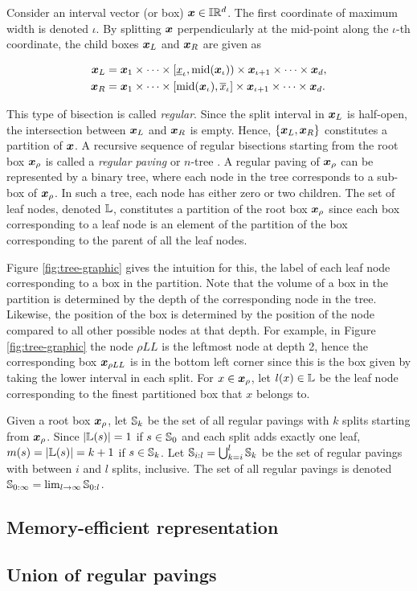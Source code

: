 \documentclass[../mapped-regular-pavings.tex]{subfiles}
\begin{document}
  
  Consider an interval vector (or box) $\x \in \Iz \Rz^d$.
  The first coordinate of maximum width is denoted $\iota$.
  By splitting $\x$ perpendicularly at the mid-point along the $\iota$-th coordinate, 
  the child boxes $\x_L$ and $\x_R$ are given as

  \begin{align*}
    \x_L &= \x_1 \times \dots \times [\ul x_\iota, \fct{mid} (\x_\iota) ) \times \x_{\iota + 1} \times \dots \times \x_d, \\
    \x_R &= \x_1 \times \dots \times [\fct{mid} (\x_\iota), \ol x_\iota ] \times \x_{\iota + 1} \times \dots \times \x_d.
  \end{align*}

  This type of bisection is called \textit{regular}.
  Since the split interval in $\x_L$ is half-open, 
  the intersection between $\x_L$ and $\x_R$ is empty.
  Hence, $\{ \x_L, \x_R \}$ constitutes a partition of $\x$.
  A recursive sequence of regular bisections starting from the root box $\x_\rho$ is 
  called a \textit{regular paving} or $n$-tree \cite{scala-density-tree}.
  A regular paving of $\x_\rho$ can be represented by a binary tree, 
  where each node in the tree corresponds to a sub-box of $\x_\rho$.
  In such a tree, each node has either zero or two children.
  The set of leaf nodes, denoted $\mathbb{L}$, constitutes 
  a partition of the root box $\x_\rho$ since each box corresponding to 
  a leaf node is an element of the partition of the box corresponding to the parent of all the leaf nodes.

  Figure \ref{fig:tree-graphic} gives the intuition for this, 
  the label of each leaf node corresponding to a box in the partition.
  Note that the volume of a box in the partition is determined by 
  the depth of the corresponding node in the tree.
  Likewise, the position of the box is determined by 
  the position of the node compared to all other possible nodes at that depth.
  For example, in Figure \ref{fig:tree-graphic} the node $\rho LL$ is the leftmost node at depth 2,
  hence the corresponding box $\x_{\rho LL}$ is in the bottom left corner since 
  this is the box given by taking the lower interval in each split.
  For $x \in \x_\rho$, let $l(x) \in \mathbb{L}$ be the leaf node 
  corresponding to the finest partitioned box that $x$ belongs to.

  

  Given a root box $\x_\rho$, let $\mathbb{S}_k$ be 
  the set of all regular pavings with $k$ splits starting from $\x_\rho$.
  Since $|\mathbb{L}(s)| = 1$ if $s \in \mathbb{S}_0$ and each split adds exactly one leaf, 
  $m(s) = |\mathbb{L}(s)| = k + 1$ if $s \in \mathbb{S}_k$.
  Let $\mathbb{S}_{i:l} = \bigcup_{k = i}^l \mathbb{S}_k$ be the set of 
  regular pavings with between $i$ and $l$ splits, inclusive.
  The set of all regular pavings is denoted $\mathbb{S}_{0:\infty} = \lim_{l \to \infty} \mathbb{S}_{0:l}$.

  \subsection{Memory-efficient representation}
    \label{sec:leaves-only-rp}
    

  \subsection{Union of regular pavings}
    
\end{document}
